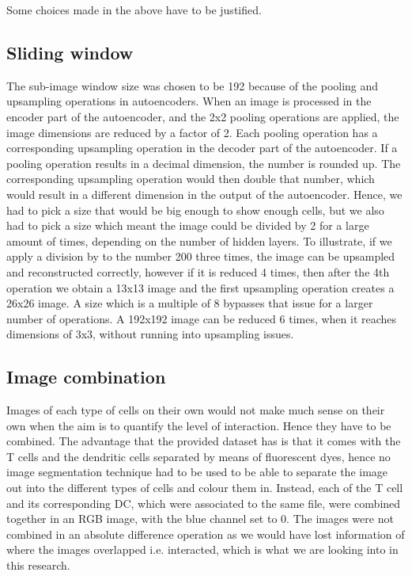 \documentclass{l4proj}
\begin{document}
Some choices made in the above have to be justified.

\subsection{Sliding window}

The sub-image window size was chosen to be 192 because of the pooling and upsampling operations in autoencoders. When an image is processed in the encoder part of the autoencoder, and the 2x2 pooling operations are applied, the image dimensions are reduced by a factor of 2. Each pooling operation has a corresponding upsampling operation in the decoder part of the autoencoder. If a pooling operation results in a decimal dimension, the number is rounded up. The corresponding upsampling operation would then double that number, which would result in a different dimension in the output of the autoencoder. Hence, we had to pick a size that would be big enough to show enough cells, but we also had to pick a size which meant the image could be divided by 2 for a large amount of times, depending on the number of hidden layers. To illustrate, if we apply a division by to the number 200 three times, the image can be upsampled and reconstructed correctly, however if it is reduced 4 times, then after the 4th operation we obtain a 13x13 image and the first upsampling operation creates a 26x26 image. A size which is a multiple of 8 bypasses that issue for a larger number of operations. A 192x192 image can be reduced 6 times, when it reaches dimensions of 3x3, without running into upsampling issues.

\subsection{Image combination}

Images of each type of cells on their own would not make much sense on their own when the aim is to quantify the level of interaction. Hence they have to be combined. The advantage that the provided dataset has is that it comes with the T cells and the dendritic cells separated by means of fluorescent dyes, hence no image segmentation technique had to be used to be able to separate the image out into the different types of cells and colour them in. Instead, each of the T cell and its corresponding DC, which were associated to the same file, were combined together in an RGB image, with the blue channel set to 0. The images were not combined in an absolute difference operation as we would have lost information of where the images overlapped i.e. interacted, which is what we are looking into in this research.
\end{document}
